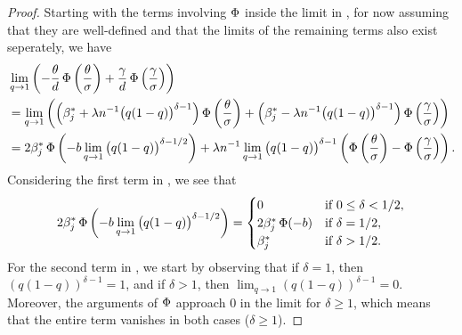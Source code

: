 \begin{proof}
  Starting with the terms involving \(\operatorname{\Phi}\) inside the limit in , for now assuming that they are well-defined and that the limits of the remaining terms also exist seperately, we have
  \begin{align}
     & \lim_{q \rightarrow 1} \left(-\frac{\theta}{d} \operatorname{\Phi}\left(\frac{\theta}{\sigma}\right) + \frac{\gamma}{d} \operatorname{\Phi} \left(\frac{\gamma}{\sigma}\right)\right)                                                                                                                                                                                      \nonumber                                                                                                                                                                                                                                                   \\
     & = \lim_{q \rightarrow 1} \left(\left(\beta_j^* + \lambda n^{-1}\big(q(1-q)\big)^{\delta - 1}\right) \operatorname{\Phi} \left(\frac{\theta}{\sigma}\right) + \left(\beta_j^* - \lambda n^{-1}\big(q(1-q)\big)^{\delta - 1}\right)\operatorname{\Phi} \left(\frac{\gamma}{\sigma}\right) \right)                                                                                                                                                                                                                                                                                                                              \nonumber \\ & = 2\beta_j^*\operatorname{\Phi} \left(- b \lim_{q \rightarrow 1} \big(q(1-q)\big)^{\delta - 1/2}\right)                                                                                                                                                                                                                                                               + \lambda n^{-1} \lim_{q \rightarrow 1} \big(q(1-q)\big)^{\delta - 1}\left(\operatorname{\Phi} \left(\frac{\theta}{\sigma}\right) - \operatorname{\Phi} \left(\frac{\gamma}{\sigma}\right)\right). \label{eq:eval-qlimit-terms}
  \end{align}
  Considering the first term in , we see that
  \[
    2\beta_j^*\operatorname{\Phi} \left(- b \lim_{q \rightarrow 1} \big(q(1-q)\big)^{\delta - 1/2}\right) =
    \begin{cases}
      0                     & \text{if } 0 \leq \delta < 1/2, \\
      2 \beta_j^* \operatorname{\Phi} (-b) & \text{if } \delta = 1/2,        \\
      \beta_j^*             & \text{if } \delta > 1/2.
    \end{cases}
  \]
  For the second term in , we start by observing that if
  \(\delta = 1\), then \(\left(q(1-q)\right)^{\delta - 1} = 1\), and if \(\delta > 1\), then \(\lim_{q\rightarrow 1}(q(1 - q))^{\delta - 1} = 0\). Moreover, the arguments of \(\operatorname{\Phi}\) approach 0 in the limit for \(\delta \geq 1\), which means that the entire term vanishes in both cases (\(\delta \geq 1\)).


\end{proof}
